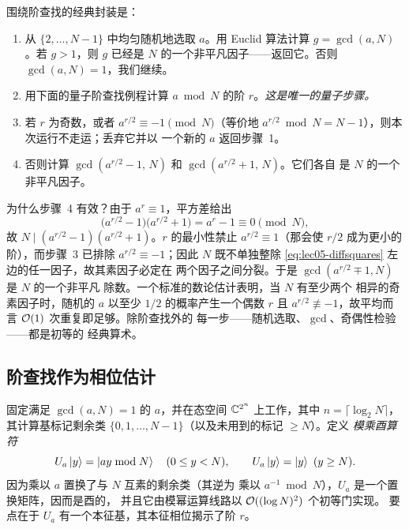 围绕阶查找的经典封装是：
\begin{enumerate}[leftmargin=1.6em,nosep]
  \item 从 $\{2,\dots,N-1\}$ 中均匀随机地选取 $a$。用
        Euclid 算法计算 $g=\gcd(a,N)$。若 $g>1$，则 $g$ 已经是
        $N$ 的一个非平凡因子——返回它。否则 $\gcd(a,N)=1$，我们继续。
  \item 用下面的量子阶查找例程计算
        $a\bmod N$ 的阶 $r$。\emph{这是唯一的量子步骤。}
  \item 若 $r$ 为奇数，或者 $a^{r/2}\equiv -1\pmod N$（等价地
        $a^{r/2}\bmod N=N-1$），则本次运行不走运；丢弃它并以
        一个新的 $a$ 返回步骤~1。
  \item 否则计算 $\gcd(a^{r/2}-1,\,N)$ 和 $\gcd(a^{r/2}+1,\,N)$。它们各自
        是 $N$ 的一个非平凡因子。
\end{enumerate}

为什么步骤~4 有效？由于 $a^{r}\equiv1$，平方差给出
\begin{equation}
  \bigl(a^{r/2}-1\bigr)\bigl(a^{r/2}+1\bigr)=a^{r}-1\equiv 0 \pmod N,
  \label{eq:lec05-diffsquares}
\end{equation}
故 $N\mid(a^{r/2}-1)(a^{r/2}+1)$。$r$ 的最小性禁止
$a^{r/2}\equiv 1$（那会使 $r/2$ 成为更小的阶），而步骤~3 已排除
$a^{r/2}\equiv -1$；因此 $N$ 既不单独整除
\eqref{eq:lec05-diffsquares} 左边的任一因子，故其素因子必定在
两个因子之间分裂。于是 $\gcd(a^{r/2}\mp1,N)$ 是 $N$ 的一个非平凡
除数。一个标准的数论估计表明，当 $N$ 有至少两个
相异的奇素因子时，随机的 $a$ 以至少 $1/2$ 的概率产生一个偶数 $r$ 且
$a^{r/2}\not\equiv-1$，故平均而言 $\mathcal{O}(1)$ 次重复即足够。除阶查找外的
每一步——随机选取、$\gcd$、奇偶性检验——都是初等的
经典算术。

\subsection*{阶查找作为相位估计}

固定满足 $\gcd(a,N)=1$ 的 $a$，并在态空间 $\mathbb{C}^{2^n}$ 上工作，其中
$n=\lceil\log_2 N\rceil$，其计算基标记剩余类
$\{0,1,\dots,N-1\}$（以及未用到的标记 $\ge N$）。定义
\emph{模乘酉算符}
\begin{equation}
  U_a\ket{y}=\ket{ay\bmod N}\quad(0\le y<N),
  \qquad U_a\ket{y}=\ket{y}\ (y\ge N).
  \label{eq:lec05-Ua}
\end{equation}
因为乘以 $a$ 置换了与 $N$ 互素的剩余类（其逆为
乘以 $a^{-1}\bmod N$），$U_a$ 是一个置换矩阵，因而是酉的，
并且它由模幂运算线路以 $\mathcal{O}((\log N)^2)$ 个初等门实现。
要点在于 $U_a$ 有一个本征基，其本征相位揭示了阶 $r$。

